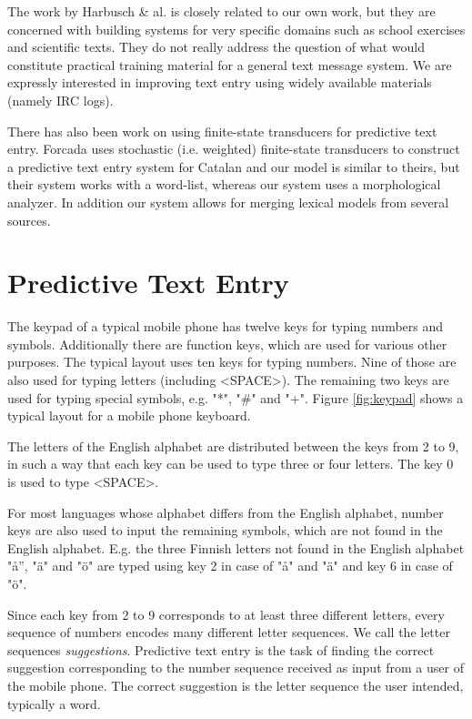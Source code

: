 \documentclass[a4paper,conference]{IEEEtran}
\begin{document}
The work by Harbusch \& al. is closely related to our own work, but they
are concerned with building systems for very specific domains such as
school exercises and scientific texts. They do not really address the
question of what would constitute practical training material for a
general text message system. We are expressly interested in improving
text entry using widely available materials (namely IRC logs).

There has also been work on using finite-state transducers for
predictive text entry. Forcada \cite{Forcada01corpus-basedstochastic} uses
stochastic (i.e. weighted) finite-state transducers to construct a
predictive text entry system for Catalan and our model is similar to
theirs, but their system works with a word-list, whereas our system
uses a morphological analyzer.  In addition our system allows for
merging lexical models from several sources.
 
\section{Predictive Text Entry}
\label{sec:text-entry}

The keypad of a typical mobile phone has twelve keys for typing
numbers and symbols. Additionally there are function keys, which are
used for various other purposes. The typical layout uses ten keys for
typing numbers. Nine of those are also used for typing letters (including
<SPACE>). The remaining two keys are used for typing special symbols,
e.g. "*", "\#" and "+". Figure \ref{fig:keypad} shows a typical layout
for a mobile phone keyboard.

The letters of the English alphabet are distributed between the keys
from 2 to 9, in such a way that each key can be used to type three or
four letters. The key 0 is used to type <SPACE>.

For most languages whose alphabet differs from the English alphabet,
number keys are also used to input the remaining symbols, which are
not found in the English alphabet. E.g. the three Finnish letters not
found in the English alphabet "å'', "\"{a}" and "\"{o}" are typed
using key 2 in case of "å" and "\"{a}" and key 6 in case of "\"{o}".

Since each key from 2 to 9 corresponds to at least three different
letters, every sequence of numbers encodes many different letter
sequences. We call the letter sequences {\it suggestions}. Predictive
text entry is the task of finding the correct suggestion corresponding
to the number sequence received as input from a user of the mobile
phone. The correct suggestion is the letter sequence the user
intended, typically a word.
\end{document}
